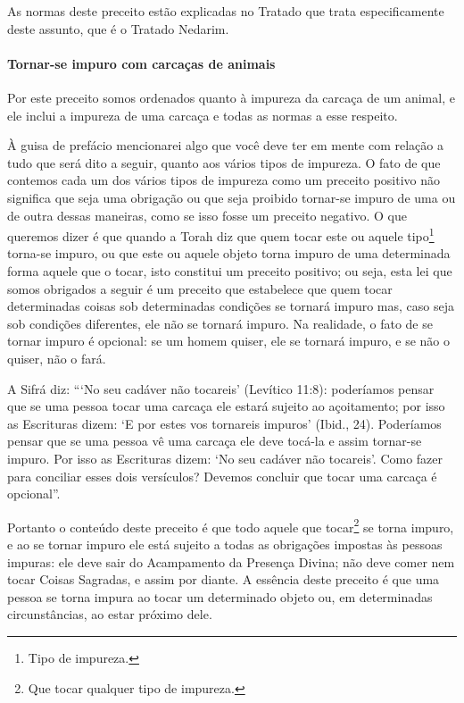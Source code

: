 As normas deste preceito estão explicadas no Tratado que trata
especificamente deste assunto, que é o Tratado Nedarim.

\paragraph{Tornar-se impuro com carcaças de animais}

Por este preceito somos ordenados quanto à impureza da carcaça de um
animal, e ele inclui a impureza de uma carcaça e todas as normas a esse
respeito.

À guisa de prefácio mencionarei algo que você deve ter em mente com
relação a tudo que será dito a seguir, quanto aos vários tipos de
impureza. O fato de que contemos cada um dos vários tipos de impureza
como um preceito positivo não significa que seja uma obrigação ou que
seja proibido tornar-se impuro de uma ou de outra dessas maneiras, como
se isso fosse um preceito negativo. O que queremos dizer é que quando a
Torah diz que quem tocar este ou aquele tipo\footnote{Tipo de impureza.}
torna-se impuro, ou que este ou aquele objeto torna impuro de uma
determinada forma aquele que o tocar, isto constitui um preceito
positivo; ou seja, esta lei que somos obrigados a seguir é um preceito
que estabelece que quem tocar determinadas coisas sob determinadas
condições se tornará impuro mas, caso seja sob condições diferentes, ele
não se tornará impuro. Na realidade, o fato de se tornar impuro é
opcional: se um homem quiser, ele se tornará impuro, e se não o quiser,
não o fará.

A Sifrá diz: ```No seu cadáver não tocareis' (Levítico 11:8):
poderíamos pensar que se uma pessoa tocar uma carcaça ele estará
sujeito ao açoitamento; por isso as Escrituras dizem: `E por estes vos
tornareis impuros' (Ibid., 24). Poderíamos pensar que se uma pessoa vê
uma carcaça ele deve tocá-la e assim tornar-se impuro. Por isso as
Escrituras dizem: `No seu cadáver não tocareis'. Como fazer para
conciliar esses dois versículos? Devemos concluir que tocar uma carcaça
é opcional''.


Portanto o conteúdo deste preceito é que todo aquele que
tocar\footnote{Que tocar qualquer tipo de impureza.} se torna impuro, e ao se tornar impuro ele
está sujeito a todas as obrigações impostas às pessoas impuras: ele deve
sair do Acampamento da Presença Divina; não deve comer nem tocar Coisas
Sagradas, e assim por diante. A essência deste preceito é que uma pessoa
se torna impura ao tocar um determinado objeto ou, em determinadas
circunstâncias, ao estar próximo dele.

